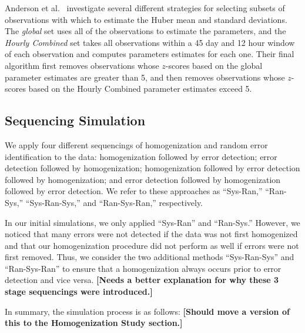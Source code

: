 \documentclass[12pt]{article}
\begin{document}
\begin{doublespacing}
Anderson et al.~\cite{bell14} investigate several different strategies for selecting subsets of observations with which to estimate the Huber mean and standard deviations.  The \emph{global} set uses all of the observations to estimate the parameters, and the \emph{Hourly Combined} set takes all observations within  a 45 day and 12 hour window of each observation and computes parameters estimates for each one.  Their final algorithm first removes observations whose $z$-scores based on the global parameter estimates are greater than 5, and then removes observations whose $z$-scores  based on the Hourly Combined parameter estimates exceed 5.  


\subsection{Sequencing Simulation}

We apply four different sequencings of homogenization and random error identification to the data: homogenization followed by error detection; error detection followed by homogenization; homogenization followed by error detection followed by homogenization; and error detection followed by homogenization followed by error detection.  We refer to these approaches as ``Sys-Ran,'' ``Ran-Sys,'' ``Sys-Ran-Sys,'' and ``Ran-Sys-Ran,'' respectively.

In our initial simulations, we  only applied ``Sys-Ran'' and ``Ran-Sys.''  However, we noticed that many errors were not detected if the data was not first homogenized and that our homogenization procedure did not perform as well if errors were not first removed.  Thus, we consider the two additional methods ``Sys-Ran-Sys'' and ``Ran-Sys-Ran'' to ensure that a homogenization always occurs prior to error detection and vice versa. \textbf{[Needs a better explanation for why these 3 stage sequencings were introduced.]}



In summary, the simulation process is as follows:  \textbf{[Should move a version of this to the Homogenization Study section.]}


\end{doublespacing}
\end{document}
